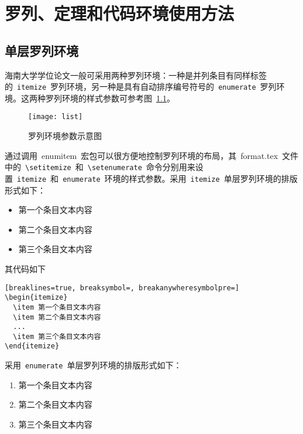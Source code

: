 
\chapter{罗列、定理和代码环境使用方法}

\section{单层罗列环境}

海南大学学位论文一般可采用两种罗列环境：一种是并列条目有同样标签的~\verb|itemize|~罗列环境，另一种是具有自动排序编号符号的~\verb|enumerate|~罗列环境。这两种罗列环境的样式参数可参考图~\ref{fig:list}。
\begin{figure}[htbp]
\centering
\texttt{[image: list]}
\caption{罗列环境参数示意图}\label{fig:list}\vspace{-1em}
\end{figure}

通过调用~enumitem~宏包可以很方便地控制罗列环境的布局，其~format.tex~文件中的~\verb|\setitemize|~和~\verb|\setenumerate|~命令分别用来设置~\verb|itemize|~和~\verb|enumerate|~环境的样式参数。采用~\verb|itemize|~单层罗列环境的排版形式如下：

\begin{itemize}
\item 第一个条目文本内容
\item 第二个条目文本内容
\item 第三个条目文本内容
\end{itemize}

其代码如下

\begin{Verbatim}[breaklines=true, breaksymbol=, breakanywheresymbolpre=]
\begin{itemize}
  \item 第一个条目文本内容
  \item 第二个条目文本内容
  ...
  \item 第三个条目文本内容
\end{itemize}
\end{Verbatim}

采用~\verb|enumerate|~单层罗列环境的排版形式如下：

\begin{enumerate}
\item 第一个条目文本内容
\item 第二个条目文本内容
\item 第三个条目文本内容
\end{enumerate}

